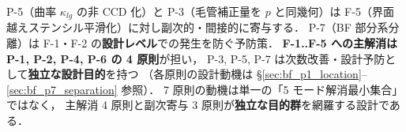 \noindent P-5（曲率 $\kappa_{lg}$ の非 CCD 化）と P-3（毛管補正量を $p$ と同幾何）は
F-5（界面越えステンシル平滑化）に対し副次的・間接的に寄与する．
P-7（BF 部分系分離）は F-1・F-2 の\textbf{設計レベル}での発生を防ぐ予防策．
\textbf{F-1..F-5 への主解消は P-1, P-2, P-4, P-6 の 4 原則}が担い，
P-3, P-5, P-7 は次数改善・設計予防として\textbf{独立な設計目的}を持つ
（各原則の設計動機は §\ref{sec:bf_p1_location}--\ref{sec:bf_p7_separation} 参照）．
7 原則の動機は単一の「5 モード解消最小集合」ではなく，
主解消 4 原則と副次寄与 3 原則が\textbf{独立な目的群}を網羅する設計である．

